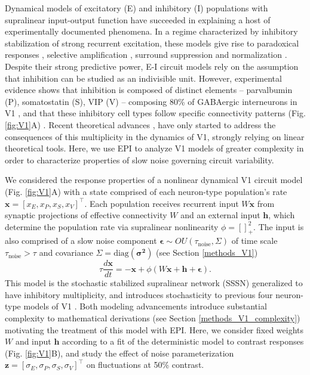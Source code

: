 \documentclass[11pt]{article}
\begin{document}
Dynamical models of excitatory (E) and inhibitory (I) populations with supralinear input-output function have succeeded in explaining a host of experimentally documented phenomena.
In a regime characterized by inhibitory stabilization of strong recurrent excitation, these models give rise to paradoxical responses \cite{tsodyks1997paradoxical}, selective amplification  \cite{goldman2009memory, murphy2009balanced}, surround suppression \cite{ozeki2009inhibitory} and normalization \cite{rubin2015stabilized}. 
Despite their strong predictive power, E-I circuit models rely on the assumption that inhibition can be studied as an indivisible unit. 
However, experimental evidence shows that inhibition is composed of distinct elements -- parvalbumin (P), somatostatin (S), VIP (V) --
composing 80\% of GABAergic interneurons in V1 \cite{markram2004interneurons, rudy2011three, tremblay2016}, and that these inhibitory cell types follow specific connectivity patterns (Fig. \ref{fig:V1}A) \cite{pfeffer2013inhibition}.
Recent theoretical advances \cite{litwin2016inhibitory, GarciaDelMolino2017, Chen2019},  have only started to address the consequences of this multiplicity in the dynamics of V1, strongly relying on linear theoretical tools. 
Here, we use EPI to analyze V1 models of greater complexity in order to characterize properties of slow noise governing circuit variability.

We considered the response properties of a nonlinear dynamical V1 circuit model (Fig. \ref{fig:V1}A) with a state comprised of each neuron-type population's rate $\mathbf{x} = \left[x_E, x_P , x_S, x_V \right]^\top$.
Each population receives recurrent input $W \mathbf{x}$ from synaptic projections of effective connectivity $W$ and an external input $\mathbf{h}$, which determine the population rate via supralinear nonlinearity $\phi = \left[\right]^2_+$.
The input is also comprised of a slow noise component $\bm{\epsilon} \sim OU\left(\tau_{\text{noise}}, \Sigma \right)$ of time scale $\tau_{\text{noise}} > \tau$ and covariance $\Sigma = \text{diag}\left(\bm{\sigma^2}\right)$ (see Section \ref{methods_V1})
\begin{equation}
    \tau \frac{d\mathbf{x}}{dt} = -\mathbf{x} +\phi(W\mathbf{x} + \mathbf{h} + \bm{\epsilon}).
\end{equation}
This model is the stochastic stabilized supralinear network (SSSN) \cite{hennequin2018dynamical} generalized to have inhibitory multiplicity, and introduces stochasticity to previous four neuron-type models of V1 \cite{litwin2016inhibitory}.
Both modeling advancements introduce substantial complexity to mathematical derivations (see Section \ref{methods_V1_complexity}) motivating the treatment of this model with EPI.
Here, we consider fixed weights $W$ and input $\mathbf{h}$ according to a fit of the deterministic model to contrast responses \cite{palmigiano2020structure} (Fig. \ref{fig:V1}B), and study the effect of noise parameterization $\mathbf{z} = [\sigma_E, \sigma_P, \sigma_S, \sigma_V]^\top$ on fluctuations at 50\% contrast. 
\end{document}
